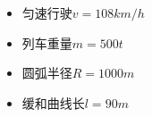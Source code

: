 \begin{itemize}
  \item 匀速行驶$v=108km/h$
  \item 列车重量$m=500t$
  \item 圆弧半径$R=1000m$
  \item 缓和曲线长$l=90m$
\end{itemize}

\begin{center}
	\quad
\end{center}

